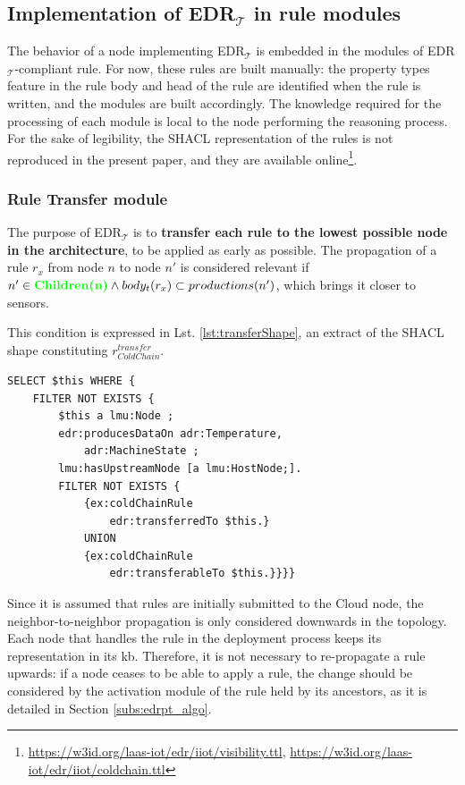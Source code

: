 \documentclass{iosart2c}
\newcommand{\edrt}{EDR$_{\mathcal{T}}$\xspace}
\newcommand{\added}[1]{\textcolor{green}{\textbf{#1}}}
\begin{document}
\subsection{Implementation of \edrt in rule modules}
\label{subs:edrt_modules}
The behavior of a node implementing \edrt is embedded in the modules of \edrt-compliant rule.
For now, these rules are built manually: the property types feature in the rule body and head of the rule are identified when the rule is written, and the modules are built accordingly.
The knowledge required for the processing of each module is local to the node performing the reasoning process. 
For the sake of legibility, the SHACL representation of the rules is not reproduced in the present paper, and they are available online\footnote{\url{https://w3id.org/laas-iot/edr/iiot/visibility.ttl}, \url{https://w3id.org/laas-iot/edr/iiot/coldchain.ttl}}.

\subsubsection{Rule Transfer module}

The purpose of \edrt is to \textbf{transfer each rule to the lowest possible node in the architecture}, to be applied as early as possible. 
The propagation of a rule $r_{x}$ from node $n$ to node $n'$ is considered relevant if $n' \in \added{Children(n)} \land body_t(r_{x}) \subset productions(n')$, which brings it closer to sensors. 

This condition is expressed in Lst. \ref{lst:transferShape}, an extract of the SHACL shape constituting $r_{ColdChain}^{transfer}$.
%
\begin{lstlisting}[float, caption=$r_{ColdChain}^{transfer}$ shape, label=lst:transferShape]
SELECT $this WHERE {
	FILTER NOT EXISTS {
		$this a lmu:Node ;
		edr:producesDataOn adr:Temperature,
			adr:MachineState ;
		lmu:hasUpstreamNode [a lmu:HostNode;].
		FILTER NOT EXISTS {
			{ex:coldChainRule 
				edr:transferredTo $this.}
			UNION
			{ex:coldChainRule 
				edr:transferableTo $this.}}}}
\end{lstlisting}

Since it is assumed that rules are initially submitted to the Cloud node, the neighbor-to-neighbor propagation is only considered downwards in the topology.
Each node that handles the rule in the deployment process keeps its representation in its \gls{kb}.
Therefore, it is not necessary to re-propagate a rule upwards: if a node ceases to be able to apply a rule, the change should be considered by the activation module of the rule held by its ancestors, as it is detailed in Section \textsection \ref{subs:edrpt_algo}.
\end{document}
